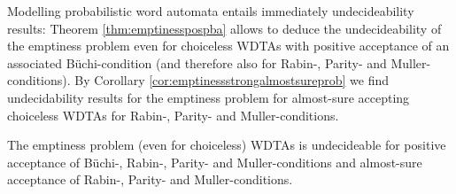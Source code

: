 Modelling probabilistic word automata entails immediately undecideability
results: Theorem \ref{thm:emptinesspospba} allows to deduce the undecideability
of the emptiness problem even for choiceless \acp{WDTA} with positive
acceptance of an associated Büchi-condition (and therefore also for Rabin-,
Parity- and Muller-conditions). By Corollary
\ref{cor:emptinessstrongalmostsureprob} we find undecidability results for the
emptiness problem for almost-sure accepting choiceless \acp{WDTA} for Rabin-,
Parity- and Muller-conditions.
\begin{corollary}
  The emptiness problem (even for choiceless) \acp{WDTA} is undecideable for
  positive acceptance of Büchi-, Rabin-, Parity- and Muller-conditions and
  almost-sure acceptance of Rabin-, Parity- and Muller-conditions.
\end{corollary}

